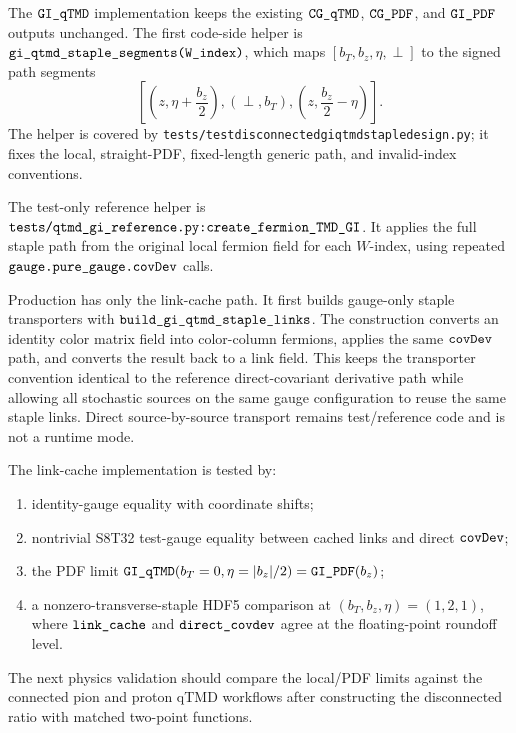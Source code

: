 \documentclass[11pt,a4paper]{article}
\newcommand{\code}[1]{\texttt{\begingroup\def\_{\textunderscore\allowbreak}#1\endgroup}}
\begin{document}
The \(\code{GI\_qTMD}\) implementation keeps the existing
\(\code{CG\_qTMD}\), \(\code{CG\_PDF}\), and \(\code{GI\_PDF}\) outputs
unchanged.  The first code-side helper is
\(\code{gi\_qtmd\_staple\_segments(W\_index)}\), which maps
\([b_T,b_z,\eta,\perp]\) to the signed path segments
\begin{equation}
  \left[
    \left(z,\eta+\frac{b_z}{2}\right),
    (\perp,b_T),
    \left(z,\frac{b_z}{2}-\eta\right)
  \right].
\end{equation}
The helper is covered by
\code{tests/test\_disconnected\_gi\_qtmd\_staple\_design.py}; it fixes the
local, straight-PDF, fixed-length generic path, and invalid-index conventions.

The test-only reference helper is
\(\code{tests/qtmd\_gi\_reference.py:create\_fermion\_TMD\_GI}\).  It applies
the full staple path from the original local fermion field for each
\(W\)-index, using repeated \(\code{gauge.pure\_gauge.covDev}\) calls.

Production has only the link-cache path.  It first builds gauge-only staple
transporters with
\(\code{build\_gi\_qtmd\_staple\_links}\).  The construction converts an
identity color matrix field into color-column fermions, applies the same
\(\code{covDev}\) path, and converts the result back to a link field.  This
keeps the transporter convention identical to the reference direct-covariant
derivative path while allowing all stochastic sources on the same gauge
configuration to reuse the same staple links.  Direct source-by-source
transport remains test/reference code and is not a runtime mode.

The link-cache implementation is tested by:
\begin{enumerate}
  \item identity-gauge equality with coordinate shifts;
  \item nontrivial S8T32 test-gauge equality between cached links and direct
        \(\code{covDev}\);
  \item the PDF limit
        \(\code{GI\_qTMD}(b_T=0,\eta=|b_z|/2)=\code{GI\_PDF}(b_z)\);
  \item a nonzero-transverse-staple HDF5 comparison at
        \((b_T,b_z,\eta)=(1,2,1)\), where \(\code{link\_cache}\) and
        \(\code{direct\_covdev}\) agree at the floating-point roundoff level.
\end{enumerate}

The next physics validation should compare the local/PDF limits against the
connected pion and proton qTMD workflows after constructing the disconnected
ratio with matched two-point functions.
\end{document}
